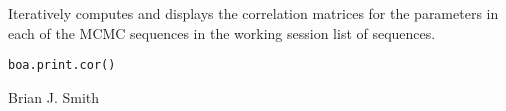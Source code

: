 \begin{Description}\relax
Iteratively computes and displays the correlation matrices for the parameters 
in each of the MCMC sequences in the working session list of sequences.
\end{Description}
\begin{Usage}
\begin{verbatim}
boa.print.cor()
\end{verbatim}
\end{Usage}
\begin{Author}\relax
Brian J. Smith
\end{Author}

